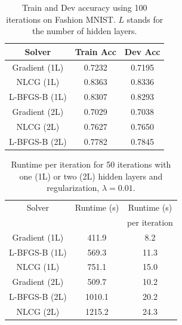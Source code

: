 \documentclass[nohyperref]{article}
\theoremstyle{plain}
\theoremstyle{definition}
\theoremstyle{remark}
\begin{document}
\begin{table}[h!]
\begin{center}
\begin{tabular}{ ccc} %
\hline
Solver & Train Acc & Dev Acc  \\ 
\hline 
\hline
Gradient (1L) & 0.7232 & 0.7195\\ 
NLCG (1L)& 0.8363 & 0.8336\\ 
L-BFGS-B (1L)& 0.8307 & 0.8293\\ 
Gradient (2L)& 0.7029 & 0.7038\\ 
NLCG (2L)& 0.7627 & 0.7650\\ 
L-BFGS-B (2L)& 0.7782 & 0.7845\\ 
\end{tabular}
\end{center}
\caption{Train and Dev accuracy using 100 iterations on Fashion MNIST. $L$ stands for the number of hidden layers.}\label{table_fashion_mnist}
\end{table}

\begin{table}[h!]
\begin{center}
\begin{tabular}{ ccc} %
\hline
Solver & Runtime (s) & Runtime (s)  \\ 
& &per iteration \\
\hline 
\hline
Gradient (1L)& 411.9 & 8.2\\ 
L-BFGS-B (1L)& 569.3  & 11.3\\ 
NLCG (1L)& 751.1 & 15.0 \\ 
Gradient (2L)& 509.7 & 10.2 \\ 
L-BFGS-B (2L)& 1010.1  & 20.2\\ 
NLCG (2L)& 1215.2 & 24.3 \\ \end{tabular}
\end{center}
\caption{Runtime per iteration for 50 iterations with one (1L) or two (2L) hidden layers and regularization, $\lambda = 0.01$.}\label{rt_nn}
\end{table}
\end{document}

